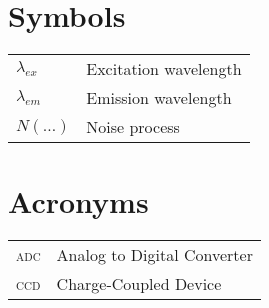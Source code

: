 \section*{Symbols}

\begin{supertabular}{ll}
$\lambda_{ex}$  &       Excitation wavelength\\
$\lambda_{em}$  &	Emission wavelength\\
$N(\ldots)$	&	Noise process\\
\end{supertabular}

\section*{Acronyms}

\begin{supertabular}{ll}
\textsc{adc}	& Analog to Digital Converter\\
\textsc{ccd}	& Charge-Coupled Device\\
\end{supertabular}
